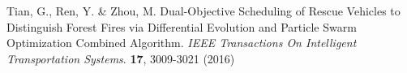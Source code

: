 \begin{thebibliography}{1}

Tian, G., Ren, Y. \& Zhou, M. Dual-Objective Scheduling of Rescue Vehicles to Distinguish Forest Fires via Differential Evolution and Particle Swarm Optimization Combined Algorithm. {\em IEEE Transactions On Intelligent Transportation Systems}. \textbf{17}, 3009-3021 (2016)

\end{thebibliography}

